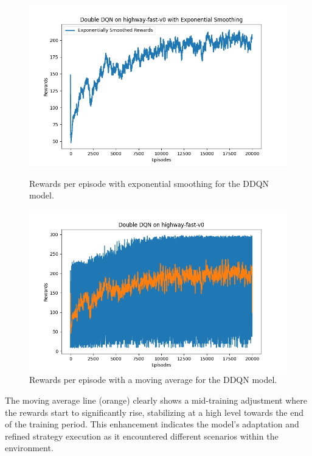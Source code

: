\documentclass{article}
\begin{document}
\begin{figure}[ht]
  \centering
  \begin{minipage}{0.48\textwidth}
      \includegraphics[width=\linewidth]{./figures/ddqn_exponential_smoothing.png}
      \caption{Rewards per episode with exponential smoothing for the DDQN model.}
      \label{fig:ddqn_exponential}
  \end{minipage}
  \begin{minipage}{0.48\textwidth}
      \includegraphics[width=\linewidth]{./figures/ddqn_moving_avg.png}
      \caption{Rewards per episode with a moving average for the DDQN model.}
      \label{fig:ddqn_moving_avg}
  \end{minipage}
\end{figure}

The moving average line (orange) clearly shows a mid-training adjustment where the rewards start to significantly rise, stabilizing at a high level towards the end of the training period. This enhancement indicates the model’s adaptation and refined strategy execution as it encountered different scenarios within the environment.
\end{document}
